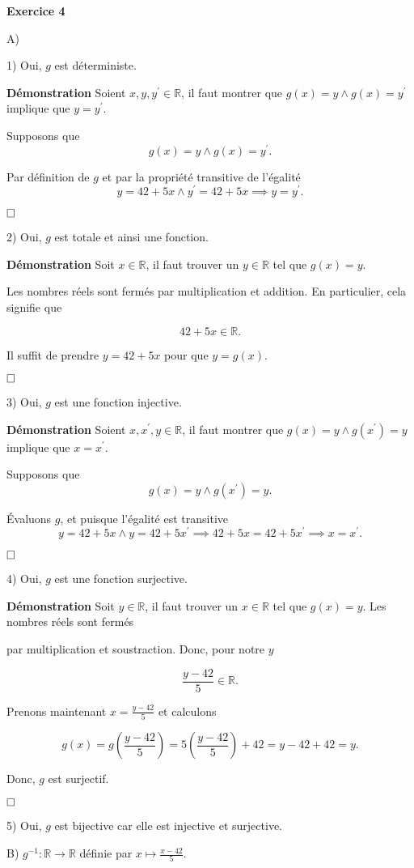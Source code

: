 \documentclass{article}
\begin{document}
\textbf{Exercice 4}

\vspace{0.5cm}

A)

1) Oui, $g$ est déterministe.

\textbf{Démonstration} Soient $x, y, y^{\prime} \in \mathbb{R}$, il faut montrer que $g(x) = y \land g(x) = y^{\prime}$ implique que $y = y^{\prime}$.

Supposons que  
$$ g(x) = y \land g(x) = y^{\prime}. $$

Par définition de $g$ et par la propriété transitive de l'égalité 
$$ y = 42 + 5x \land y^{\prime} = 42 + 5x \implies y = y^{\prime}. $$

$\hfill \square$

2) Oui, $g$ est totale et ainsi une fonction.

\textbf{Démonstration} Soit $x \in \mathbb{R}$, il faut trouver un $y \in \mathbb{R}$ tel que $g(x) = y$.

Les nombres réels sont fermés par multiplication et addition. En particulier, cela signifie que

$$ 42 + 5x  \in \mathbb{R}. $$

Il suffit de prendre $y = 42 + 5x$ pour que $y = g(x)$.

$\hfill \square$

3) Oui, $g$ est une fonction injective.

\textbf{Démonstration} Soient $x, x^{\prime}, y \in \mathbb{R}$, il faut montrer que $g(x) = y \land g(x^{\prime}) = y$ implique que $x = x^{\prime}$.

Supposons que  
$$ g(x) = y \land g(x^{\prime}) = y. $$

Évaluons $g$, et puisque l'égalité est transitive 
$$ y = 42 + 5x \land y = 42 + 5x^{\prime} \implies 42 + 5x = 42 + 5x^{\prime} \implies x = x^{\prime}. $$

$\hfill \square$

4) Oui, $g$ est une fonction surjective.

\textbf{Démonstration} Soit $y \in \mathbb{R}$, il faut trouver un $x \in \mathbb{R}$ tel que $g(x) = y$. Les nombres réels sont fermés 

par multiplication et soustraction. Donc, pour notre $y$

$$ \frac{y - 42}{5} \in \mathbb{R}. $$

Prenons maintenant $x = \frac{y - 42}{5}$ et calculons

$$ g(x) = g\left(\frac{y - 42}{5}\right) = 5\left(\frac{y - 42}{5}\right) + 42 = y - 42 + 42 = y. $$

Donc, $g$ est surjectif.

$\hfill \square$

5) Oui, $g$ est bijective car elle est injective et surjective.

\vspace{0.5cm}

B) $g^{-1} : \mathbb{R} \longrightarrow \mathbb{R}$ définie par $x \longmapsto \frac{x - 42}{5}$.
\end{document}
